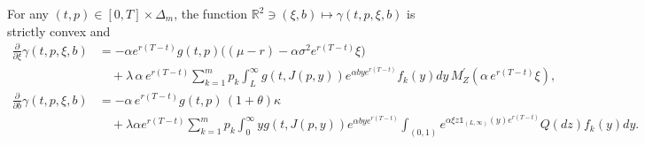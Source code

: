 \documentclass[10pt,a4paper]{amsart}
\newcommand{\R}{\mathbb{R}}
\begin{document}
\begin{lemma}\label{gamma}
	For any $(t,p)\in[0,T]\times\Delta_m$, the function $\R^2\ni (\xi,b)\mapsto \gamma(t,p,\xi,b)$ is strictly convex and
	\begin{align*}
	\frac{\partial}{\partial \xi}\gamma(t,p,\xi,b) &= -\alpha e^{r(T-t)}g(t,p)\big((\mu-r)-\alpha\sigma^2 e^{r(T-t)}\xi\big) \\
   &\quad + \lambda\,\alpha\,e^{r(T-t)}\sum_{k=1}^m p_k \int_L^\infty g(t,J(p,y))e^{\alpha b y e^{r(T-t)}}f_k(y)dy\,M_Z^\prime(\alpha\,e^{r(T-t)}\xi),\\
   \frac{\partial}{\partial b}\gamma(t,p,\xi,b) &= -\alpha\,e^{r(T-t)}g(t,p)\,(1+\theta)\kappa \\
   &\quad + \lambda\alpha e^{r(T-t)}\sum_{k=1}^m p_k\!\!\int_0^\infty\!\!\! yg(t,J(p,y))e^{\alpha b y e^{r(T-t)}}\!\!\int_{(0,1)}\!\!\!e^{\alpha \xi z\mathds{1}_{(L,\infty)}(y) e^{r(T-t)}}Q(dz)f_k(y)dy.
	\end{align*}
\end{lemma}
\end{document}
